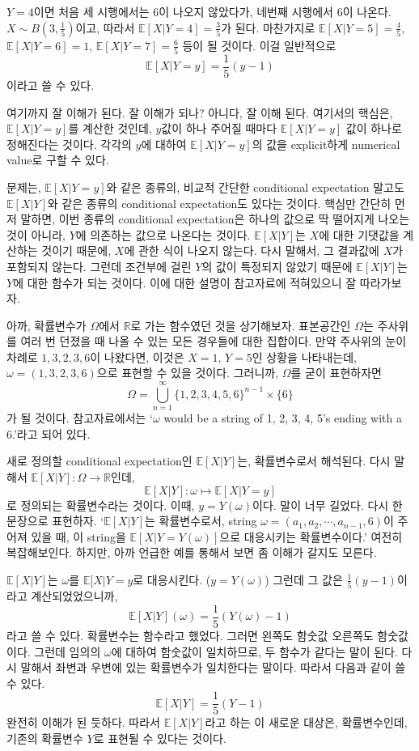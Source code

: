 \documentclass{article}
\begin{document}
\(Y=4\)이면 처음 세 시행에서는 6이 나오지 않았다가, 네번째 시행에서 6이 나온다.
\(X\sim B(3,\frac15)\)이고, 따라서 \(\mathbb E[X|Y=4]=\frac35\)가 된다.
마찬가지로 \(\mathbb E[X|Y=5]=\frac45\), \(\mathbb E[X|Y=6]=1\), \(\mathbb E[X|Y=7]=\frac65\) 등이 될 것이다.
이걸 일반적으로
\[\mathbb E[X|Y=y]=\frac15(y-1)\]
이라고 쓸 수 있다.

여기까지 잘 이해가 된다.
잘 이해가 되나?
아니다, 잘 이해 된다.
여기서의 핵심은, \(\mathbb E[X|Y=y]\)를 계산한 것인데, \(y\)값이 하나 주어질 때마다 \(\mathbb E[X|Y=y]\) 값이 하나로 정해진다는 것이다.
각각의 \(y\)에 대하여 \(\mathbb E[X|Y=y]\)의 값을 explicit하게 numerical value로 구할 수 있다.

문제는, \(\mathbb E[X|Y=y]\)와 같은 종류의, 비교적 간단한 conditional expectation 말고도 \(\mathbb E[X|Y]\)와 같은 종류의 conditional expectation도 있다는 것이다.
핵심만 간단히 먼저 말하면, 이번 종류의 conditional expectation은 하나의 값으로 딱 떨어지게 나오는 것이 아니라, \(Y\)에 의존하는 값으로 나온다는 것이다.
\(\mathbb E[X|Y]\)는 \(X\)에 대한 기댓값을 계산하는 것이기 때문에, \(X\)에 관한 식이 나오지 않는다.
다시 말해서, 그 결과값에 \(X\)가 포함되지 않는다.
그런데 조건부에 걸린 \(Y\)의 값이 특정되지 않았기 때문에 \(\mathbb E[X|Y]\)는 \(Y\)에 대한 함수가 되는 것이다.
이에 대한 설명이 참고자료에 적혀있으니 잘 따라가보자.

아까, 확률변수가 \(\Omega\)에서 \(\mathbb R\)로 가는 함수였던 것을 상기해보자.
표본공간인 \(\Omega\)는 주사위를 여러 번 던졌을 때 나올 수 있는 모든 경우들에 대한 집합이다.
만약 주사위의 눈이 차례로 \(1,3,2,3,6\)이 나왔다면, 이것은 \(X=1\), \(Y=5\)인 상황을 나타내는데, \(\omega=(1,3,2,3,6)\)으로 표현할 수 있을 것이다.
그러니까, \(\Omega\)를 굳이 표현하자면
\[\Omega=\bigcup_{n=1}^\infty\{1,2,3,4,5,6\}^{n-1}\times\{6\}\]
가 될 것이다.
참고자료에서는 `\(\omega\) would be a string of 1, 2, 3, 4, 5's ending with a 6.'라고 되어 있다.

새로 정의할 conditional expectation인 \(\mathbb E[X|Y]\)는, 확률변수로서 해석된다.
다시 말해서 \(\mathbb E[X|Y]:\Omega\to\mathbb R\)인데,
\[\mathbb E[X|Y]:\omega\mapsto\mathbb E[X|Y=y]\]
로 정의되는 확률변수라는 것이다.
이때, \(y=Y(\omega)\)이다.
말이 너무 길었다. 다시 한 문장으로 표현하자.
`\(\mathbb E[X|Y]\)는 확률변수로서, string \(\omega=(a_1,a_2,\cdots,a_{n-1},6)\)이 주어져 있을 때, 이 string을 \(\mathbb E[X|Y=Y(\omega)]\)으로 대응시키는 확률변수이다.'
여전히 복잡해보인다.
하지만, 아까 언급한 예를 통해서 보면 좀 이해가 갈지도 모른다.

\(\mathbb E[X|Y]\)는 \(\omega\)를 \(\mathbb E[X|Y=y\)로 대응시킨다. (\(y=Y(\omega)\))
그런데 그 값은 \(\frac15(y-1)\)이라고 계산되었었으니까,
\[\mathbb E[X|Y](\omega)=\frac15\left(Y(\omega)-1\right)\]
라고 쓸 수 있다.
확률변수는 함수라고 했었다.
그러면 왼쪽도 함숫값 오른쪽도 함숫값이다.
그런데 임의의 \(\omega\)에 대하여 함숫값이 일치하므로, 두 함수가 같다는 말이 된다.
다시 말해서 좌변과 우변에 있는 확률변수가 일치한다는 말이다.
따라서 다음과 같이 쓸 수 있다.
\[\mathbb E[X|Y]=\frac15\left(Y-1\right)\]
완전히 이해가 된 듯하다.
따라서 \(\mathbb E[X|Y]\)라고 하는 이 새로운 대상은, 확률변수인데, 기존의 확률변수 \(Y\)로 표현될 수 있다는 것이다.
\end{document}
